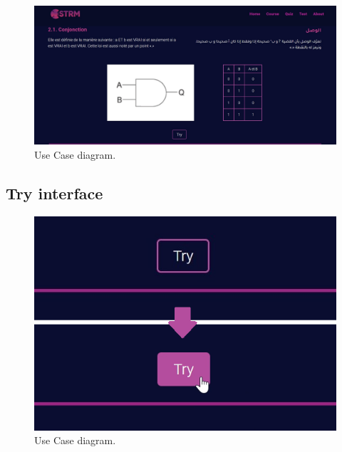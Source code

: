 \begin{figure}[ht]
	\centering
	\label{}\includegraphics[scale=0.5]{img/14.jpg}                
	\caption{Use Case diagram.} 
	\label{fig:UseCaseD}
\end{figure} 

\newpage
\subsection{Try interface}


\begin{figure}[ht]
	\centering
	\label{}\includegraphics[scale=0.5]{img/13.png}                
	\caption{Use Case diagram.} 
	\label{fig:UseCaseD}
\end{figure} 



